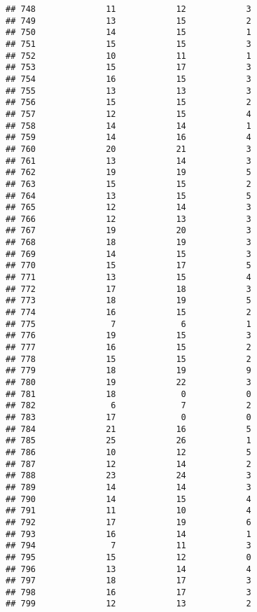 \documentclass[
]{article}
\begin{document}
\begin{verbatim}
## 748              11            12            3
## 749              13            15            2
## 750              14            15            1
## 751              15            15            3
## 752              10            11            1
## 753              15            17            3
## 754              16            15            3
## 755              13            13            3
## 756              15            15            2
## 757              12            15            4
## 758              14            14            1
## 759              14            16            4
## 760              20            21            3
## 761              13            14            3
## 762              19            19            5
## 763              15            15            2
## 764              13            15            5
## 765              12            14            3
## 766              12            13            3
## 767              19            20            3
## 768              18            19            3
## 769              14            15            3
## 770              15            17            5
## 771              13            15            4
## 772              17            18            3
## 773              18            19            5
## 774              16            15            2
## 775               7             6            1
## 776              19            15            3
## 777              16            15            2
## 778              15            15            2
## 779              18            19            9
## 780              19            22            3
## 781              18             0            0
## 782               6             7            2
## 783              17             0            0
## 784              21            16            5
## 785              25            26            1
## 786              10            12            5
## 787              12            14            2
## 788              23            24            3
## 789              14            14            3
## 790              14            15            4
## 791              11            10            4
## 792              17            19            6
## 793              16            14            1
## 794               7            11            3
## 795              15            12            0
## 796              13            14            4
## 797              18            17            3
## 798              16            17            3
## 799              12            13            2

\end{verbatim}
\end{document}
